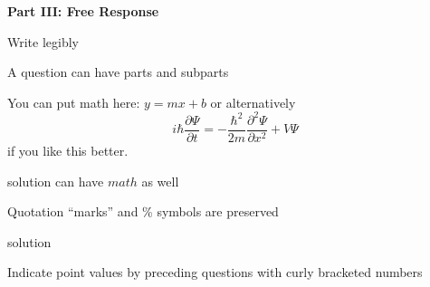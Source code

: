 \documentclass{exam}
\begin{document}
\newpage
\par\noindent \textbf{\large  Part III: Free Response}
\par\noindent  Write legibly
\begin{questions}
\setcounter{question}{20}
\question A question can have parts and subparts
\question You can put math here: $y=mx+b$ or alternatively \[i\hbar \frac{\partial \Psi}{\partial t} = -\frac{\hbar^2}{2m}\frac{\partial^2 \Psi}{\partial x^2} + V \Psi\] if you like this better.
	\begin{solution}[20 pt]
	solution can have $math$ as well
	\end{solution}
\question Quotation ``marks'' and \% symbols are preserved
	\begin{solution}[20 pt]
	solution
	\end{solution}
\question[3]  Indicate point values by preceding questions with curly bracketed numbers
\end{questions}
\end{document}
